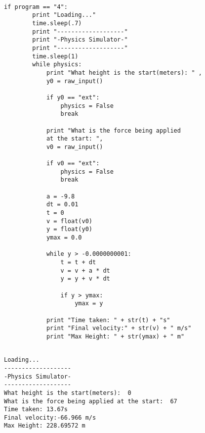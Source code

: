 \documentclass{tufte-handout}
\begin{document}
\begin{framed}
\begin{verbatim}

if program == "4":
        print "Loading..."
        time.sleep(.7)
        print "-------------------"
        print "-Physics Simulator-"
        print "-------------------"
        time.sleep(1)
        while physics:
            print "What height is the start(meters): " ,
            y0 = raw_input()

            if y0 == "ext":
                physics = False
                break

            print "What is the force being applied 
            at the start: ",
            v0 = raw_input()

            if v0 == "ext":
                physics = False
                break

            a = -9.8
            dt = 0.01
            t = 0
            v = float(v0)
            y = float(y0)
            ymax = 0.0

            while y > -0.0000000001:
                t = t + dt
                v = v + a * dt
                y = y + v * dt

                if y > ymax:
                    ymax = y

            print "Time taken: " + str(t) + "s"
            print "Final velocity:" + str(v) + " m/s"
            print "Max Height: " + str(ymax) + " m"
                
\end{verbatim}
\end{framed}


\begin{shaded}
\begin{verbatim}
Loading...
-------------------
-Physics Simulator-
-------------------
What height is the start(meters):  0
What is the force being applied at the start:  67
Time taken: 13.67s
Final velocity:-66.966 m/s
Max Height: 228.69572 m
\end{verbatim}
\end{shaded}

\vspace{1cm}



\end{document}
